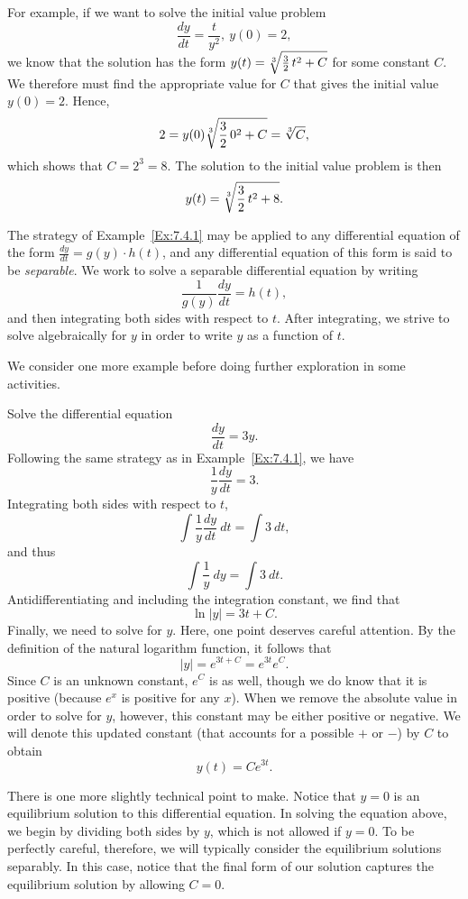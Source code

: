 For example, if we want to solve the initial value problem
$$
  \frac{dy}{dt} = \frac{t}{y^2}, \
  y(0) = 2,
$$
we know that the solution has the form $y(t) = \sqrt[3]{\frac32\thinspace
  t^2 + C}$ for some constant $C$.  We therefore must find the appropriate
value for $C$ that gives the initial value $y(0)=2$.  Hence,
$$
  2 = y(0)  \sqrt[3]{\frac 32 \thinspace 0^2 + C} = \sqrt[3]{C},
  $$
which shows that $C = 2^3 = 8$.  The solution to the initial value problem is then
$$
y(t) = \sqrt[3]{\frac32\thinspace t^2+8}.
$$
\afterex

The strategy of Example~\ref{Ex:7.4.1} may be applied to any differential equation of the form $\frac{dy}{dt} = g(y) \cdot h(t)$, and any differential equation of this form is said to be \emph{separable}.  We work to solve a separable differential equation by writing
$$\frac{1}{g(y)} \frac{dy}{dt} = h(t),$$ 
and then integrating both sides with respect to $t$.  After integrating, we strive to solve algebraically for $y$ in order to write $y$ as a function of $t$.

We consider one more example before doing further exploration in some activities.

\bex \label{Ex:7.4.2}
Solve the differential equation
$$\frac{dy}{dt} =3y.$$
\eex
Following the same strategy as in Example~\ref{Ex:7.4.1}, we have
$$  \frac 1y \frac{dy}{dt} = 3. $$
Integrating both sides with respect to $t$,
$$  \int \frac 1y\frac{dy}{dt}~dt = \int 3~dt,$$
and thus 
$$ \int \frac 1y~dy =  \int 3~dt.$$
Antidifferentiating and including the integration constant, we find that
$$  \ln|y| = 3t + C.$$
Finally, we need to solve for $y$.  Here, one point deserves careful
attention.  By the definition of the natural logarithm function, it follows that
$$
|y| = e^{3t+C} = e^{3t}e^C.
$$
Since $C$ is an unknown constant, $e^C$ is as well, though we do know
that it is positive (because $e^x$ is positive for any $x$).
When we remove the absolute value in order to solve for $y$, however, this constant may be either positive or
negative.  We 
will denote this updated constant (that accounts for a possible $+$ or $-$) by $C$ to obtain
$$
y(t) = Ce^{3t}.
$$

There is one more slightly technical point to make.  Notice that $y=0$
is an equilibrium solution to this differential equation.  In solving
the equation above, we begin by dividing both sides by $y$, which
is not allowed if $y=0$.  To be perfectly careful, therefore, we will typically
consider the equilibrium solutions separably.  In this case, notice that the final
form of our solution captures the equilibrium solution by allowing
$C=0$. 
\afterex

